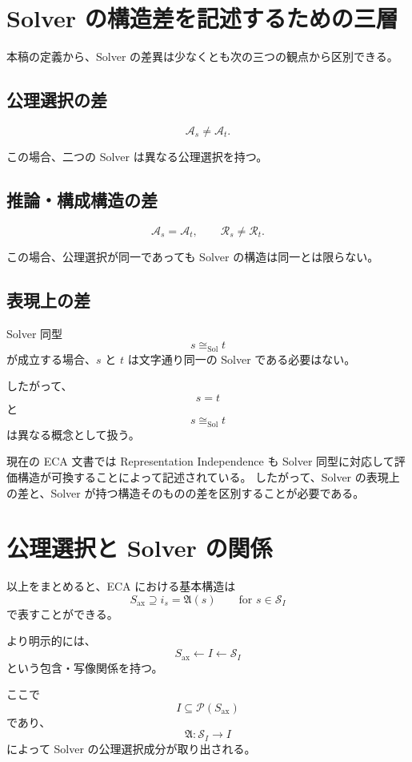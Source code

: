 \documentclass[a4paper,11pt]{article}
\newcommand{\Solver}{\mathcal{S}}
\newcommand{\Ax}{S_{\mathrm{ax}}}
\newcommand{\Sel}{I}
\begin{document}
\section{Solver の構造差を記述するための三層}

本稿の定義から、Solver の差異は少なくとも次の三つの観点から区別できる。

\subsection{公理選択の差}

\[
\mathcal{A}_s\neq\mathcal{A}_t.
\]

この場合、二つの Solver は異なる公理選択を持つ。

\subsection{推論・構成構造の差}

\[
\mathcal{A}_s=\mathcal{A}_t,
\qquad
\mathcal{R}_s\neq\mathcal{R}_t.
\]

この場合、公理選択が同一であっても Solver の構造は同一とは限らない。

\subsection{表現上の差}

Solver 同型
\[
s\cong_{\mathrm{Sol}}t
\]
が成立する場合、$s$ と $t$ は文字通り同一の Solver である必要はない。

したがって、
\[
s=t
\]
と
\[
s\cong_{\mathrm{Sol}}t
\]
は異なる概念として扱う。

現在の ECA 文書では Representation Independence も Solver 同型に対応して評価構造が可換することによって記述されている。
したがって、Solver の表現上の差と、Solver が持つ構造そのものの差を区別することが必要である。

\section{公理選択と Solver の関係}

以上をまとめると、ECA における基本構造は
\[
\boxed{
\Ax
\supseteq
i_s=\mathfrak{A}(s)
\qquad
\text{for }s\in\Solver_{\Sel}
}
\]
で表すことができる。

より明示的には、
\[
\boxed{
\Ax
\longleftarrow
\Sel
\longleftarrow
\Solver_{\Sel}
}
\]
という包含・写像関係を持つ。

ここで
\[
\Sel\subseteq\mathcal{P}(\Ax)
\]
であり、
\[
\mathfrak{A}:\Solver_{\Sel}\to\Sel
\]
によって Solver の公理選択成分が取り出される。
\end{document}
